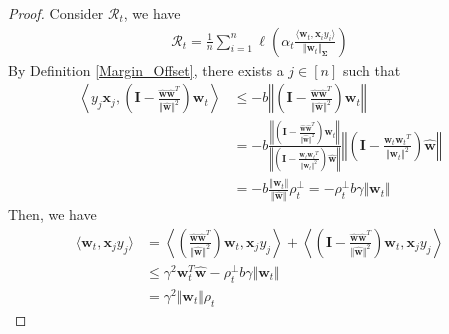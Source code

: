 \documentclass[pdflatex,sn-basic]{sn-jnl}%
\theoremstyle{thmstyleone}%
\begin{document}
\begin{appendices}
\begin{proof}
  Consider $\mathcal{R}_t$, we have 
  \begin{equation*}
  \begin{aligned}
    \mathcal{R}_t = \frac{1}{n} \sum_{i=1}^{n} \ell \left( \alpha_t \frac{\langle \mathbf{w}_t, \mathbf{x}_i y_i \rangle}{\Vert \mathbf{w}_t \Vert_{\mathbf{\Sigma}}} \right)
  \end{aligned}
  \end{equation*}
  By Definition \ref{Margin_Offset}, there exists a $j \in [n]$ such that 
  \begin{equation*}
  \begin{aligned}
    \left\langle y_j \mathbf{x}_j, 
    \left( \mathbf{I} - \frac{ \hat{\mathbf{w}} \hat{\mathbf{w}}^T }{\Vert \hat{\mathbf{w}} \Vert^2} \right)
    \mathbf{w}_t \right\rangle 
    & \leq -b \left\Vert \left( \mathbf{I} - \frac{ \hat{\mathbf{w}} \hat{\mathbf{w}}^T }{\Vert \hat{\mathbf{w}} \Vert^2} \right)
    \mathbf{w}_t \right\Vert 
    \\ & =
    -b 
    \frac{\left\Vert \left( \mathbf{I} - \frac{ \hat{\mathbf{w}} \hat{\mathbf{w}}^T }{\Vert \hat{\mathbf{w}} \Vert^2} \right)
    \mathbf{w}_t \right\Vert }{
      \left\Vert \left( \mathbf{I} - \frac{ {\mathbf{w}_t} {\mathbf{w}_t}^T }{\Vert {\mathbf{w}_t} \Vert^2} \right)
    \hat{\mathbf{w}} \right\Vert 
    }
    \left\Vert \left( \mathbf{I} - \frac{ {\mathbf{w}_t} {\mathbf{w}_t}^T }{\Vert {\mathbf{w}_t} \Vert^2} \right)
    \hat{\mathbf{w}} \right\Vert 
    \\ & =
    -b 
    \frac{\Vert \mathbf{w}_t \Vert}{\Vert \hat{\mathbf{w}} \Vert}
    \rho_t^{\perp}
    =
    - \rho_t^{\perp} b \gamma \Vert \mathbf{w}_t \Vert
  \end{aligned}
  \end{equation*}
  Then, we have 
  \begin{equation*}
  \begin{aligned}
    \langle \mathbf{w}_t, \mathbf{x}_j y_j \rangle
    & = 
    \left\langle \left( \frac{ \hat{\mathbf{w}} \hat{\mathbf{w}}^T }{\Vert \hat{\mathbf{w}} \Vert^2} \right)\mathbf{w}_t, \mathbf{x}_j y_j  \right\rangle + 
    \left\langle \left( \mathbf{I} - \frac{ \hat{\mathbf{w}} \hat{\mathbf{w}}^T }{\Vert \hat{\mathbf{w}} \Vert^2} \right)\mathbf{w}_t, \mathbf{x}_j y_j \right \rangle
    \\ & \le 
    \gamma^2 \mathbf{w}_t^T \hat{\mathbf{w}}
    - \rho_t^{\perp} b \gamma \Vert \mathbf{w}_t \Vert
    \\ & =
    \gamma^2 \Vert \mathbf{w}_t \Vert \rho_t

\end{aligned}
\end{equation*}
\end{proof}
\end{appendices}
\end{document}
